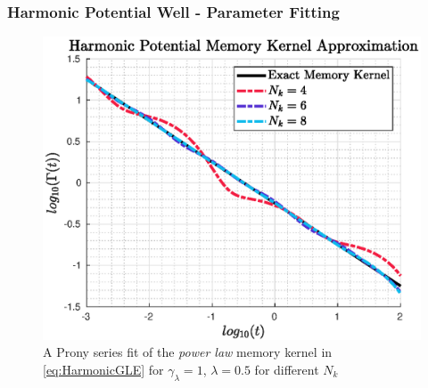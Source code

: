 \documentclass[a4paper,10pt]{beamer}
\begin{document}
	\begin{frame}
		\frametitle{Harmonic Potential Well - Parameter Fitting}
		\begin{figure}[H]
			\centering
			\includegraphics[width=0.75\linewidth]{./Plots/ParameterFittingExample/paramFit.eps}
			\caption{A Prony series fit of the \textit{power law} memory kernel in \cref{eq:HarmonicGLE} for
				$\gamma_{\lambda} = 1$, $\lambda = 0.5$ for different $N_{k}$}
		\end{figure}
	\end{frame}
\end{document}
